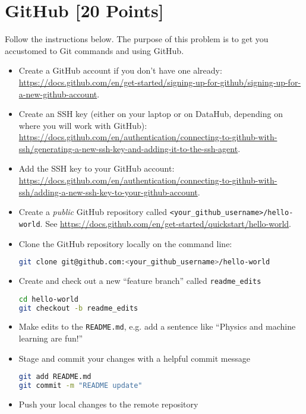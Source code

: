 \newpage
\section{GitHub [20 Points]}

\begin{problem}[20]
Follow the instructions below.
The purpose of this problem is to get you accustomed to Git commands and using GitHub.

\begin{itemize}
	\item Create a GitHub account if you don't have one already: \url{https://docs.github.com/en/get-started/signing-up-for-github/signing-up-for-a-new-github-account}.
	\item Create an SSH key (either on your laptop or on DataHub, depending on where you will work with GitHub): \url{https://docs.github.com/en/authentication/connecting-to-github-with-ssh/generating-a-new-ssh-key-and-adding-it-to-the-ssh-agent}.
	\item Add the SSH key to your GitHub account: \url{https://docs.github.com/en/authentication/connecting-to-github-with-ssh/adding-a-new-ssh-key-to-your-github-account}.
	\item Create a \emph{public} GitHub repository called \texttt{<your_github_username>/hello-world}. See \url{https://docs.github.com/en/get-started/quickstart/hello-world}.
	\item Clone the GitHub repository locally on the command line:
	      \begin{lstlisting}[language=bash]
git clone git@github.com:<your_github_username>/hello-world
		\end{lstlisting}
	\item Create and check out a new ``feature branch'' called \texttt{readme_edits}
	      \begin{lstlisting}[language=bash]
cd hello-world
git checkout -b readme_edits
  \end{lstlisting}
	\item Make edits to the \texttt{README.md}, e.g. add a sentence like ``Physics and machine learning are fun!''
	\item Stage and commit your changes with a helpful commit message
	      \begin{lstlisting}[language=bash]
git add README.md
git commit -m "README update"
\end{lstlisting}
	\item Push your local changes to the remote repository

\end{itemize}
\end{problem}
